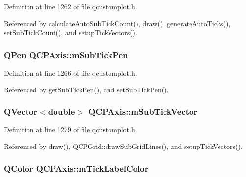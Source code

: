 Definition at line 1262 of file qcustomplot.\+h.



Referenced by calculate\+Auto\+Sub\+Tick\+Count(), draw(), generate\+Auto\+Ticks(), set\+Sub\+Tick\+Count(), and setup\+Tick\+Vectors().

\hypertarget{class_q_c_p_axis_a32ef56d3a417866720eb12667d27dbd1}{}
\subsubsection[{m\+Sub\+Tick\+Pen}]{\setlength{\rightskip}{0pt plus 5cm}Q\+Pen Q\+C\+P\+Axis\+::m\+Sub\+Tick\+Pen\hspace{0.3cm}{\ttfamily [protected]}}\label{class_q_c_p_axis_a32ef56d3a417866720eb12667d27dbd1}


Definition at line 1266 of file qcustomplot.\+h.



Referenced by get\+Sub\+Tick\+Pen(), and set\+Sub\+Tick\+Pen().

\hypertarget{class_q_c_p_axis_a28353081e0ff35c3fe5ced923a287faa}{}
\subsubsection[{m\+Sub\+Tick\+Vector}]{\setlength{\rightskip}{0pt plus 5cm}Q\+Vector$<$double$>$ Q\+C\+P\+Axis\+::m\+Sub\+Tick\+Vector\hspace{0.3cm}{\ttfamily [protected]}}\label{class_q_c_p_axis_a28353081e0ff35c3fe5ced923a287faa}


Definition at line 1279 of file qcustomplot.\+h.



Referenced by draw(), Q\+C\+P\+Grid\+::draw\+Sub\+Grid\+Lines(), and setup\+Tick\+Vectors().

\hypertarget{class_q_c_p_axis_a6384a749b3b56a97df081d8082321ab4}{}
\subsubsection[{m\+Tick\+Label\+Color}]{\setlength{\rightskip}{0pt plus 5cm}Q\+Color Q\+C\+P\+Axis\+::m\+Tick\+Label\+Color\hspace{0.3cm}{\ttfamily [protected]}}\label{class_q_c_p_axis_a6384a749b3b56a97df081d8082321ab4}


